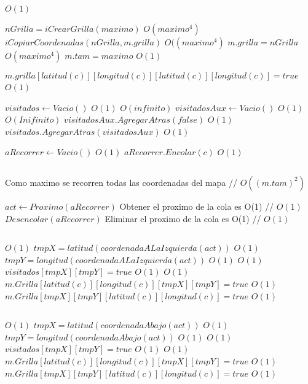 \begin{Algoritmos}
\begin{algorithmic}[1]
\State {} \Comment $O(1)$

\State $nGrilla = iCrearGrilla(maximo)$ \Comment $O(maximo^4)$
\State $iCopiarCoordenadas(nGrilla, m.grilla)$ \Comment $O((maximo^4)$
\State $m.grilla = nGrilla$ \Comment $O(maximo^4)$
\State $m.tam = maximo$ \Comment $O(1)$

\EndIf

\State $m.grilla[latitud(c)][longitud(c)][latitud(c)][longitud(c)] = true$ \Comment $O(1)$
\State $ $

\State $visitados \gets Vacio() $ \Comment $O(1)$
	    \Comment $O(infinito)$
\State $visitadosAux \gets Vacio() $ \Comment $O(1)$	
      \Comment $O(Inifinito)$
\State $visitadosAux.AgregarAtras(false)$ \Comment $O(1)$
\EndFor
\State $visitados.AgregarAtras(visitadosAux)$ \Comment $O(1)$
\EndFor


\State $aRecorrer \gets Vacio() $ \Comment $O(1)$
\State $aRecorrer.Encolar(c)$ \Comment $O(1)$

\State $ $

    \Comment Como maximo se recorren todas las coordenadas del mapa // $O((m.tam)^2)$

\State $act \gets Proximo(aRecorrer)$ \Comment Obtener el proximo de la cola es O(1) // $O(1)$
\State $Desencolar(aRecorrer)$ \Comment Eliminar el proximo de la cola es O(1) // $O(1)$

\State $ $


      \Comment $O(1)$
\State $tmpX = latitud(coordenadaALaIzquierda(act))$   \Comment $O(1)$
\State $tmpY = longitud(coordenadaALaIzquierda(act))$  \Comment $O(1)$
    \Comment $O(1)$
\State $visitados[tmpX][tmpY] = true$    \Comment $O(1)$
	 	\Comment $O(1)$
		\State $m.Grilla[latitud(c)][longitud(c)][tmpX][tmpY] = true$ \Comment $O(1)$
		\State $m.Grilla[tmpX][tmpY][latitud(c)][longitud(c)] = true$ \Comment $O(1)$
	\EndIf
\EndIf
\EndIf

\State $ $

      \Comment $O(1)$
\State $tmpX = latitud(coordenadaAbajo(act))$   \Comment $O(1)$
\State $tmpY = longitud(coordenadaAbajo(act))$  \Comment $O(1)$
    \Comment $O(1)$
\State $visitados[tmpX][tmpY] = true$    \Comment $O(1)$
	 	\Comment $O(1)$
		\State $m.Grilla[latitud(c)][longitud(c)][tmpX][tmpY] = true$ \Comment $O(1)$
		\State $m.Grilla[tmpX][tmpY][latitud(c)][longitud(c)] = true$ \Comment $O(1)$
	\EndIf
\EndIf
\EndIf


\end{algorithmic}
\end{Algoritmos}
